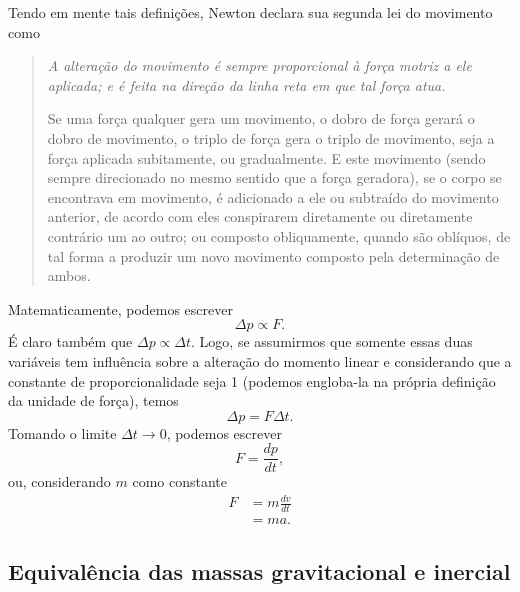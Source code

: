 Tendo em mente tais definições, Newton declara sua segunda lei do movimento como
\begin{quote}
\emph{A alteração do movimento é sempre proporcional à força motriz a ele aplicada; e é feita na direção da linha reta em que tal força atua.}

Se uma força qualquer gera um movimento, o dobro de força gerará o dobro de movimento, o triplo de força gera o triplo de movimento, seja a força aplicada subitamente, ou gradualmente. E este movimento (sendo sempre direcionado no mesmo sentido que a força geradora), se o corpo se encontrava em movimento, é adicionado a ele ou subtraído do movimento anterior, de acordo com eles conspirarem diretamente ou diretamente contrário um ao outro; ou composto obliquamente, quando são oblíquos, de tal forma a produzir um novo movimento composto pela determinação de ambos.
\end{quote}
%
Matematicamente, podemos escrever
\begin{equation}
  \Delta p \propto F.
\end{equation}
%
É claro também que $\Delta p \propto \Delta t$. Logo, se assumirmos que somente essas duas variáveis tem influência sobre a alteração do momento linear e considerando que a constante de proporcionalidade seja 1 (podemos engloba-la na própria definição da unidade de força), temos
\begin{equation}
  \Delta p = F \Delta t.
\end{equation}
%
Tomando o limite $\Delta t \to 0$, podemos escrever
\begin{equation}
  F = \frac{dp}{dt},
\end{equation}
%
ou, considerando $m$ como constante
\begin{align}
  F &= m\frac{dv}{dt} \\
  &= ma.
\end{align}

\subsection{Equivalência das massas gravitacional e inercial}

